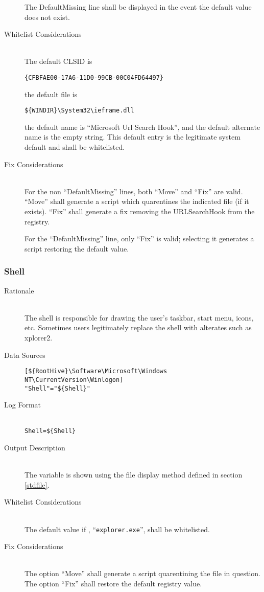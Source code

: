 \begin{description}
The DefaultMissing line shall be displayed in the event the default value does
not exist.
\item[Whitelist Considerations] \hfill \\
The default CLSID is
\vspace{-\baselineskip}
\begin{verbatim}
{CFBFAE00-17A6-11D0-99CB-00C04FD64497}
\end{verbatim}
the default file is
\vspace{-\baselineskip}
\begin{verbatim}
${WINDIR}\System32\ieframe.dll
\end{verbatim}
the default name
is ``Microsoft Url Search Hook'', and the default alternate name is the empty
string.
This default entry is the legitimate system default and shall be whitelisted.
\item[Fix Considerations] \hfill \\
For the non ``DefaultMissing'' lines, both ``Move'' and ``Fix'' are valid.
``Move'' shall generate a script which quarentines the indicated file (if it
exists). ``Fix'' shall generate a fix removing the URLSearchHook from the
registry.

For the ``DefaultMissing'' line, only ``Fix'' is valid; selecting it generates a
script restoring the default value.
\end{description}

\subsubsection{Shell}
\begin{description}
\item[Rationale] \hfill \\
The shell is responsible for drawing the user's taskbar, start menu, icons, etc.
Sometimes users legitimately replace the shell with alterates such as xplorer2.
\item[Data Sources] \hfill
\vspace{-\baselineskip}
\begin{verbatim}
[${RootHive}\Software\Microsoft\Windows NT\CurrentVersion\Winlogon]
"Shell"="${Shell}"
\end{verbatim}
\item[Log Format] \hfill \\
\verb|Shell=${Shell}|
\item[Output Description] \hfill \\
The variable  is shown using the file display method defined in
section \ref{stdfile}.
\item[Whitelist Considerations] \hfill \\
The default value if , ``\verb|explorer.exe|'', shall be whitelisted.
\item[Fix Considerations] \hfill \\
The option ``Move'' shall generate a script quarentining the file in question.
The option ``Fix'' shall restore the default registry value.
\end{description}

